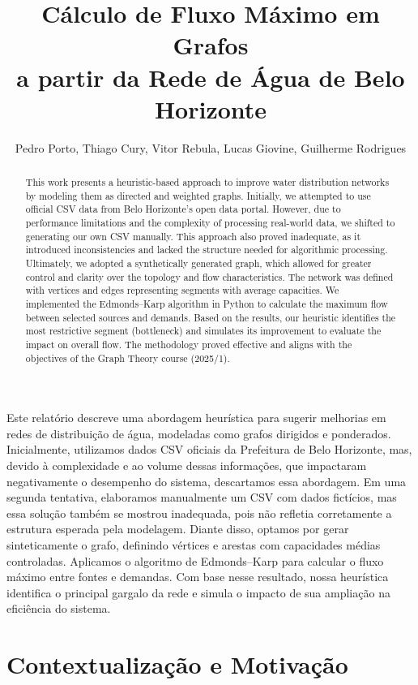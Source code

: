 \documentclass[12pt]{article}
\title{Cálculo de Fluxo Máximo em Grafos\\
       a partir da Rede de Água de Belo Horizonte}
\author{Pedro Porto, Thiago Cury, Vitor Rebula, Lucas Giovine, Guilherme Rodrigues}
\begin{document}
\maketitle

\begin{abstract}
  This work presents a heuristic-based approach to improve water distribution networks by modeling them as directed and weighted graphs. Initially, we attempted to use official CSV data from Belo Horizonte’s open data portal. However, due to performance limitations and the complexity of processing real-world data, we shifted to generating our own CSV manually. This approach also proved inadequate, as it introduced inconsistencies and lacked the structure needed for algorithmic processing. Ultimately, we adopted a synthetically generated graph, which allowed for greater control and clarity over the topology and flow characteristics. The network was defined with vertices and edges representing segments with average capacities. We implemented the Edmonds–Karp algorithm in Python to calculate the maximum flow between selected sources and demands. Based on the results, our heuristic identifies the most restrictive segment (bottleneck) and simulates its improvement to evaluate the impact on overall flow. The methodology proved effective and aligns with the objectives of the Graph Theory course (2025/1).
\end{abstract}

\begin{resumo}
  Este relatório descreve uma abordagem heurística para sugerir melhorias em redes de distribuição de água, modeladas como grafos dirigidos e ponderados. Inicialmente, utilizamos dados CSV oficiais da Prefeitura de Belo Horizonte, mas, devido à complexidade e ao volume dessas informações, que impactaram negativamente o desempenho do sistema, descartamos essa abordagem. Em uma segunda tentativa, elaboramos manualmente um CSV com dados fictícios, mas essa solução também se mostrou inadequada, pois não refletia corretamente a estrutura esperada pela modelagem. Diante disso, optamos por gerar sinteticamente o grafo, definindo vértices e arestas com capacidades médias controladas. Aplicamos o algoritmo de Edmonds–Karp para calcular o fluxo máximo entre fontes e demandas. Com base nesse resultado, nossa heurística identifica o principal gargalo da rede e simula o impacto de sua ampliação na eficiência do sistema.
\end{resumo}

\section{Contextualização e Motivação}
\end{document}
